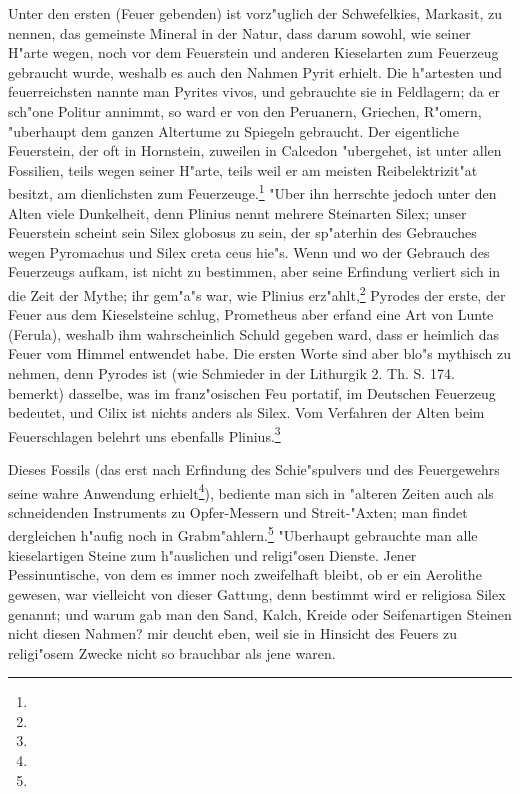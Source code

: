\documentclass[a4paper, 11pt, oneside, polutonikogreek, german]{article}
\begin{document}
Unter den ersten (Feuer gebenden) ist vorz"uglich der Schwefelkies, Markasit, zu nennen, das gemeinste Mineral in der Natur, dass darum sowohl, wie seiner H"arte wegen, noch vor dem Feuerstein und anderen Kieselarten zum Feuerzeug gebraucht wurde, weshalb es auch den Nahmen Pyrit erhielt. Die h"artesten und feuerreichsten nannte man Pyrites vivos, und gebrauchte sie in Feldlagern; da er sch"one Politur annimmt, so ward er von den Peruanern, Griechen, R"omern, "uberhaupt dem ganzen Altertume zu Spiegeln gebraucht. Der eigentliche Feuerstein, der oft in Hornstein, zuweilen in Calcedon "ubergehet, ist unter allen Fossilien, teils wegen seiner H"arte, teils weil er am meisten Reibelektrizit"at besitzt, am dienlichsten zum Feuerzeuge.\footnote{} "Uber ihn herrschte jedoch unter den Alten viele Dunkelheit, denn Plinius nennt mehrere Steinarten Silex; unser Feuerstein scheint sein Silex globosus zu sein, der sp"aterhin des Gebrauches wegen Pyromachus und Silex creta ceus hie"s. Wenn und wo der Gebrauch des Feuerzeugs aufkam, ist nicht zu bestimmen, aber seine Erfindung verliert sich in die Zeit der Mythe; ihr gem"a"s war, wie Plinius erz"ahlt,\footnote{} Pyrodes der erste, der Feuer aus dem Kieselsteine schlug, Prometheus aber erfand eine Art von Lunte (Ferula), weshalb ihm wahrscheinlich Schuld gegeben ward, dass er heimlich das Feuer vom Himmel entwendet habe. Die ersten Worte sind aber blo"s mythisch zu nehmen, denn Pyrodes ist (wie Schmieder in der Lithurgik 2. Th. S. 174. bemerkt) dasselbe, was im franz"osischen Feu portatif, im Deutschen Feuerzeug bedeutet, und Cilix ist nichts anders als Silex. Vom Verfahren der Alten beim Feuerschlagen belehrt uns ebenfalls Plinius.\footnote{}

Dieses Fossils (das erst nach Erfindung des Schie"spulvers und des Feuergewehrs seine wahre Anwendung erhielt\footnote{}), bediente man sich in "alteren Zeiten auch als schneidenden Instruments zu Opfer-Messern und Streit-"Axten; man findet dergleichen h"aufig noch in Grabm"ahlern.\footnote{} "Uberhaupt gebrauchte man alle kieselartigen Steine zum h"auslichen und religi"osen Dienste. Jener Pessinuntische, von dem es immer noch zweifelhaft bleibt, ob er ein Aerolithe gewesen, war vielleicht von dieser Gattung, denn bestimmt wird er religiosa Silex genannt; und warum gab man den Sand, Kalch, Kreide oder Seifenartigen Steinen nicht diesen Nahmen? mir deucht eben, weil sie in Hinsicht des Feuers zu religi"osem Zwecke nicht so brauchbar als jene waren.
\end{document}

